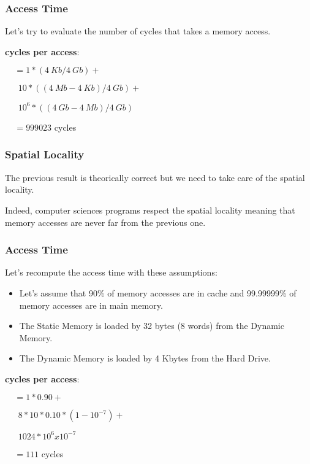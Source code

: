 
\begin{frame}
  \frametitle{Access Time}

  Let's try to evaluate the number of cycles that takes a memory access.

  \begin{center}
  \end{center}

  \nl

  \textbf{cycles per access}:

  $~~~~~= 1 * (4~Kb / 4~Gb) +$

  $~~~~~~~ 10 * ((4~Mb - 4~Kb) / 4~Gb) +$

  $~~~~~~~ 10^{6} * ((4~Gb - 4~Mb) / 4~Gb)$

  $~~~~~= 999 023$ cycles
\end{frame}


\begin{frame}
  \frametitle{Spatial Locality}

  The previous result is theorically correct but we need to take care
  of the spatial locality.

  \nl

  Indeed, computer sciences programs respect the spatial locality meaning
  that memory accesses are never far from the previous one.

  \begin{center}
  \end{center}
\end{frame}


\begin{frame}
  \frametitle{Access Time}

  Let's recompute the access time with these assumptions:

  \begin{itemize}
    \item
      Let's assume that 90\% of memory accesses are in cache and
      99.99999\% of memory accesses are in main memory.
    \item
      The Static Memory is loaded by 32 bytes (8 words) from the
      Dynamic Memory.
    \item
      The Dynamic Memory is loaded by 4 Kbytes from the Hard Drive.
  \end{itemize}

  \nl

  \textbf{cycles per access}:

  $~~~~~ = 1 * 0.90 +$

  $~~~~~~~ 8 * 10 * 0.10 * (1 - 10^{-7}) +$

  $~~~~~~~ 1024 * 10^{6} x 10^{-7}$

  $~~~~~ = 111$ cycles
\end{frame}

